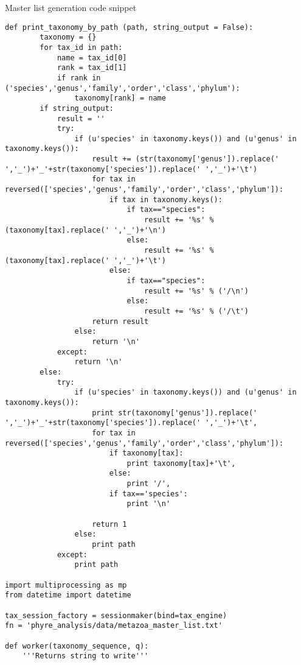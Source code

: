 \documentclass[a4paper,11pt]{article}
\begin{document}
Master list generation code snippet 

\begin{lstlisting}
def print_taxonomy_by_path (path, string_output = False):
        taxonomy = {}
        for tax_id in path:
            name = tax_id[0]
            rank = tax_id[1]
            if rank in ('species','genus','family','order','class','phylum'):
                taxonomy[rank] = name
        if string_output:
            result = ''
            try:
                if (u'species' in taxonomy.keys()) and (u'genus' in taxonomy.keys()):
                    result += (str(taxonomy['genus']).replace(' ','_')+'_'+str(taxonomy['species']).replace(' ','_')+'\t')
                    for tax in reversed(['species','genus','family','order','class','phylum']):
                        if tax in taxonomy.keys():
                            if tax=="species":
                                result += '%s' % (taxonomy[tax].replace(' ','_')+'\n')
                            else:
                                result += '%s' % (taxonomy[tax].replace(' ','_')+'\t')
                        else:
                            if tax=="species":
                                result += '%s' % ('/\n')
                            else:
                                result += '%s' % ('/\t')
                    return result
                else:
                    return '\n'
            except:
                return '\n'
        else:
            try:
                if (u'species' in taxonomy.keys()) and (u'genus' in taxonomy.keys()):
                    print str(taxonomy['genus']).replace(' ','_')+'_'+str(taxonomy['species']).replace(' ','_')+'\t',
                    for tax in reversed(['species','genus','family','order','class','phylum']):
                        if taxonomy[tax]:
                            print taxonomy[tax]+'\t',
                        else:
                            print '/',
                        if tax=='species':
                            print '\n'
                    
                    return 1
                else:
                    print path
            except:
                print path
        
import multiprocessing as mp
from datetime import datetime

tax_session_factory = sessionmaker(bind=tax_engine)
fn = 'phyre_analysis/data/metazoa_master_list.txt'

def worker(taxonomy_sequence, q):
    '''Returns string to write'''
    

\end{lstlisting}
\end{document}
